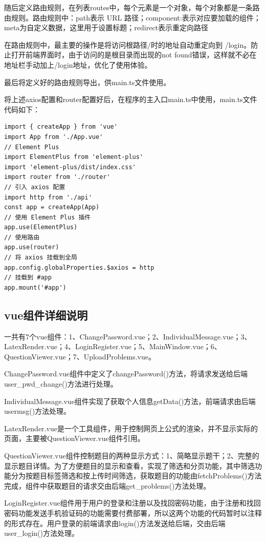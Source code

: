 \documentclass[a4paper,AutoFakeBold={2.7}]{ctexart} %
\begin{document}
随后定义路由规则，在列表routes中，每个元素是一个对象，每个对象都是一条路由规则。路由规则中：path表示 URL 路径；component:表示对应要加载的组件；meta为自定义数据，这里用于设置标题；redirect表示重定向路径

在路由规则中，最主要的操作是将访问根路径/时的地址自动重定向到 /login。防止打开前端界面时，由于访问的是根目录而出现的not found错误，这样就不必在地址栏手动加上/login地址，优化了使用体验。

最后将定义好的路由规则导出，供main.ts文件使用。

将上述axios配置和router配置好后，在程序的主入口main.ts中使用，main.ts文件代码如下：

\begin{lstlisting}
import { createApp } from 'vue'
import App from './App.vue'
// Element Plus
import ElementPlus from 'element-plus'
import 'element-plus/dist/index.css'
import router from './router'
// 引入 axios 配置
import http from './api'
const app = createApp(App)
// 使用 Element Plus 插件
app.use(ElementPlus)
// 使用路由
app.use(router)
// 将 axios 挂载到全局
app.config.globalProperties.$axios = http
// 挂载到 #app
app.mount('#app')
\end{lstlisting}

\subsection{vue组件详细说明}

一共有7个vue组件：1、ChangePassword.vue；2、IndividualMessage.vue；3、LatexRender.vue；4、LoginRegister.vue；5、MainWindow.vue；6、QuestionViewer.vue；7、UploadProblems.vue。

ChangePassword.vue组件中定义了changePassword()方法，将请求发送给后端user\_pwd\_change()方法进行处理。

IndividualMessage.vue组件实现了获取个人信息getData()方法，前端请求由后端usermsg()方法处理。

LatexRender.vue是一个工具组件，用于控制网页上公式的渲染，并不显示实际的页面，主要被QuestionViewer.vue组件引用。

QuestionViewer.vue组件控制题目的两种显示方式：1、简略显示题干；2、完整的显示题目详情。为了方便题目的显示和查看，实现了筛选和分页功能，其中筛选功能分为按题目标签筛选和按上传时间筛选，获取题目的功能由fetchProblems()方法完成，组件中获取题目的请求交由后端get\_problems()方法处理。

LoginRegister.vue组件用于用户的登录和注册以及找回密码功能，由于注册和找回密码功能发送手机验证码的功能需要付费部署，所以这两个功能的代码暂时以注释的形式存在。用户登录的前端请求由login()方法发送给后端，交由后端user\_login()方法处理。
\end{document}
